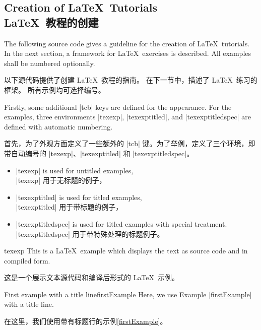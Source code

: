 \subsection{Creation of \LaTeX\ Tutorials\\\LaTeX\ 教程的创建}\label{sec:latextutorial}

The following source code gives a guideline for the creation of \LaTeX\ tutorials.
In the next section, a framework for \LaTeX\ exercises is described.
All examples shall be numbered optionally.

以下源代码提供了创建 \LaTeX\ 教程的指南。 在下一节中，描述了 \LaTeX\ 练习的框架。 所有示例均可选择编号。

Firstly, some additional |tcb| keys are defined for the appearance.
For the examples, three environments |texexp|, |texexptitled|,
and |texexptitledspec| are defined with automatic numbering.

首先，为了外观方面定义了一些额外的 |tcb| 键。为了举例，定义了三个环境，即带自动编号的 |texexp|、|texexptitled| 和 |texexptitledspec|。
\begin{itemize}
\item |texexp| is used for untitled examples,
\\|texexp| 用于无标题的例子，
\item |texexptitled| is used for titled examples,
\\|texexptitled| 用于带标题的例子，
\item |texexptitledspec| is used for titled examples with special treatment.
\\|texexptitledspec| 用于带特殊处理的标题例子。
\end{itemize}


\begin{dispExample}
\begin{tcblisting}{texexp}
This is a \LaTeX\ example which displays the text as source code
and in compiled form.

这是一个展示文本源代码和编译后形式的 \LaTeX\ 示例。
\end{tcblisting}
\end{dispExample}


\begin{dispExample}
\begin{texexptitled}{First example with a title line}{firstExample}
Here, we use Example \ref{firstExample} with a title line.

在这里，我们使用带有标题行的示例\ref{firstExample}。
\end{texexptitled}
\end{dispExample}


